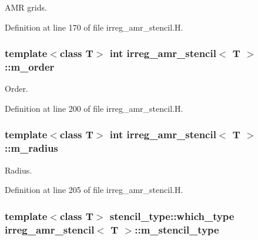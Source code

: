 A\+MR grids. 



Definition at line 170 of file irreg\+\_\+amr\+\_\+stencil.\+H.

\subsubsection[{\texorpdfstring{m\+\_\+order}{m_order}}]{\setlength{\rightskip}{0pt plus 5cm}template$<$class T$>$ int {\bf irreg\+\_\+amr\+\_\+stencil}$<$ T $>$\+::m\+\_\+order\hspace{0.3cm}{\ttfamily [protected]}}\hypertarget{classirreg__amr__stencil_a7ec2ca575e1c50f7d6265db198b18c8e}{}\label{classirreg__amr__stencil_a7ec2ca575e1c50f7d6265db198b18c8e}


Order. 



Definition at line 200 of file irreg\+\_\+amr\+\_\+stencil.\+H.

\subsubsection[{\texorpdfstring{m\+\_\+radius}{m_radius}}]{\setlength{\rightskip}{0pt plus 5cm}template$<$class T$>$ int {\bf irreg\+\_\+amr\+\_\+stencil}$<$ T $>$\+::m\+\_\+radius\hspace{0.3cm}{\ttfamily [protected]}}\hypertarget{classirreg__amr__stencil_abaf4503961d3b768341eaec30b551236}{}\label{classirreg__amr__stencil_abaf4503961d3b768341eaec30b551236}


Radius. 



Definition at line 205 of file irreg\+\_\+amr\+\_\+stencil.\+H.

\subsubsection[{\texorpdfstring{m\+\_\+stencil\+\_\+type}{m_stencil_type}}]{\setlength{\rightskip}{0pt plus 5cm}template$<$class T$>$ {\bf stencil\+\_\+type\+::which\+\_\+type} {\bf irreg\+\_\+amr\+\_\+stencil}$<$ T $>$\+::m\+\_\+stencil\+\_\+type\hspace{0.3cm}{\ttfamily [protected]}}\hypertarget{classirreg__amr__stencil_a3391d92c08649f84308dccbc4c3d66f8}{}\label{classirreg__amr__stencil_a3391d92c08649f84308dccbc4c3d66f8}


